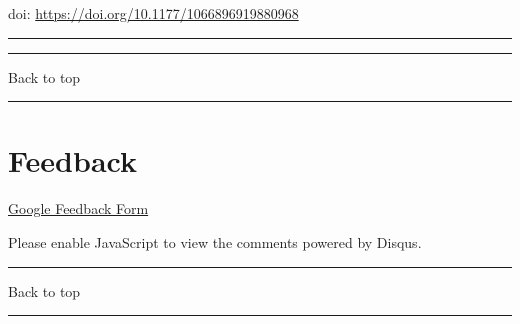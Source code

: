 \documentclass[
]{article}
\begin{document}
doi: \url{https://doi.org/10.1177/1066896919880968}

\begin{center}\rule{0.5\linewidth}{0.5pt}\end{center}

\begin{center}\rule{0.5\linewidth}{0.5pt}\end{center}

Back to top

\begin{center}\rule{0.5\linewidth}{0.5pt}\end{center}

\pagebreak

\hypertarget{feedback}{%
\section{Feedback}\label{feedback}}

\href{https://docs.google.com/forms/d/e/1FAIpQLSeD3Z9J6Y7eMmiyM12f_SfAmHUlykb1zxZcwO6lg7cebGYQIQ/viewform}{Google
Feedback Form}

\hypertarget{disqus_thread}{}

Please enable JavaScript to view the comments powered by Disqus.

\begin{center}\rule{0.5\linewidth}{0.5pt}\end{center}

Back to top

\begin{center}\rule{0.5\linewidth}{0.5pt}\end{center}

\pagebreak
\end{document}
